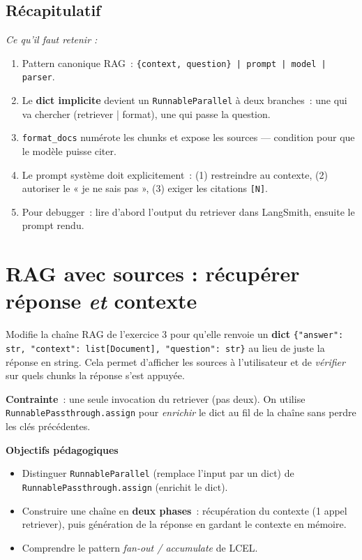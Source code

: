 \documentclass[11pt,a4paper]{article}
\begin{document}
\subsection*{Récapitulatif}
{\itshape\sloppy
\textit{Ce qu'il faut retenir :}
\begin{enumerate}[leftmargin=*]
  \item Pattern canonique RAG~: \texttt{\{context, question\} | prompt |
        model | parser}.
  \item Le \textbf{dict implicite} devient un \texttt{RunnableParallel}
        à deux branches~: une qui va chercher (retriever | format), une
        qui passe la question.
  \item \texttt{format\_docs} numérote les chunks et expose les sources —
        condition pour que le modèle puisse citer.
  \item Le prompt système doit explicitement~: (1) restreindre au
        contexte, (2) autoriser le « je ne sais pas », (3) exiger les
        citations \texttt{[N]}.
  \item Pour debugger~: lire d'abord l'output du retriever dans
        LangSmith, ensuite le prompt rendu.
\end{enumerate}
\par}

\section{RAG avec sources : récupérer réponse \emph{et} contexte}

\begin{tcolorbox}[title=Exercice 4. Préserver les documents sources dans la sortie]
Modifie la chaîne RAG de l'exercice 3 pour qu'elle renvoie un
\textbf{dict} \texttt{\{"answer": str, "context": list[Document],
"question": str\}} au lieu de juste la réponse en string. Cela permet
d'afficher les sources à l'utilisateur et de \emph{vérifier} sur quels
chunks la réponse s'est appuyée.

\textbf{Contrainte}~: une seule invocation du retriever (pas deux). On
utilise \texttt{RunnablePassthrough.assign} pour \emph{enrichir} le dict
au fil de la chaîne sans perdre les clés précédentes.

\bigskip
\noindent\textbf{Objectifs pédagogiques}
\begin{itemize}[leftmargin=*]
  \item Distinguer \texttt{RunnableParallel} (remplace l'input par un
        dict) de \texttt{RunnablePassthrough.assign} (enrichit le dict).
  \item Construire une chaîne en \textbf{deux phases}~: récupération du
        contexte (1 appel retriever), puis génération de la réponse en
        gardant le contexte en mémoire.
  \item Comprendre le pattern \emph{fan-out / accumulate} de LCEL.
\end{itemize}
\end{tcolorbox}
\end{document}
